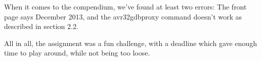 When it comes to the compendium, we’ve found at least two errors: The front page says December 2013, and the avr32gdbproxy command doesn’t work as described in section 2.2.

All in all, the assignment was a fun challenge, with a deadline which gave enough time to play around, while not being too loose.
